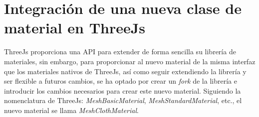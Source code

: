 






\section{Integraci\'on de una nueva clase de material en ThreeJs}
ThreeJs proporciona una API para extender de forma sencilla su librer\'ia de materiales, sin embargo, para proporcionar al nuevo
material de la misma interfaz que los materiales nativos de ThreeJs, as\'i como seguir extendiendo la librer\'ia y ser flexible
a futuros cambios, se ha optado por crear un \textit{fork} de la librer\'ia e introducir los cambios necesarios para crear
este nuevo material. Siguiendo la nomenclatura de ThreeJs: \textit{MeshBasicMaterial}, \textit{MeshStandardMaterial}, etc., el
nuevo material se llama \textit{MeshClothMaterial}.\\

